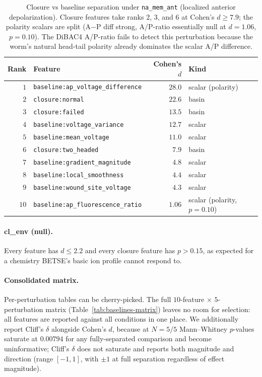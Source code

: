 \documentclass[11pt,a4paper]{article}
\begin{document}
\begin{table}[h]\centering\small
\caption{Closure vs baseline separation under \texttt{na\_mem\_ant} (localized anterior depolarization). Closure features take ranks $2$, $3$, and $6$ at Cohen's $d\geq 7.9$; the polarity scalars are split (A$-$P diff strong, A/P-ratio essentially null at $d=1.06$, $p=0.10$). The DiBAC4 A/P-ratio fails to detect this perturbation because the worm's natural head-tail polarity already dominates the scalar A/P difference.}\label{tab:baselines-naant}
\begin{tabular}{rlrl}\toprule
Rank & Feature & Cohen's $d$ & Kind \\
\midrule
$1$  & \texttt{baseline:ap\_voltage\_difference} & $\mathbf{28.0}$ & scalar (polarity) \\
$2$  & \texttt{closure:normal}                    & $\mathbf{22.6}$ & basin \\
$3$  & \texttt{closure:failed}                    & $13.5$  & basin \\
$4$  & \texttt{baseline:voltage\_variance}        & $12.7$  & scalar \\
$5$  & \texttt{baseline:mean\_voltage}            & $11.0$  & scalar \\
$6$  & \texttt{closure:two\_headed}               & $7.9$   & basin \\
$7$  & \texttt{baseline:gradient\_magnitude}      & $4.8$   & scalar \\
$8$  & \texttt{baseline:local\_smoothness}        & $4.4$   & scalar \\
$9$  & \texttt{baseline:wound\_site\_voltage}     & $4.3$   & scalar \\
$10$ & \texttt{baseline:ap\_fluorescence\_ratio}  & $1.06$  & scalar (polarity, $p=0.10$) \\
\bottomrule\end{tabular}
\end{table}

\paragraph{cl\_env (null).}
Every feature has $d\leq 2.2$ and every closure feature has $p>0.15$, as expected for a chemistry BETSE's basic ion profile cannot respond to.

\paragraph{Consolidated matrix.}
Per-perturbation tables can be cherry-picked. The full $10$-feature $\times$ $5$-perturbation matrix (Table~\ref{tab:baselines-matrix}) leaves no room for selection: all features are reported against all conditions in one place. We additionally report Cliff's $\delta$ alongside Cohen's $d$, because at $N=5/5$ Mann--Whitney $p$-values saturate at $0.00794$ for any fully-separated comparison and become uninformative; Cliff's $\delta$ does not saturate and reports both magnitude and direction (range $[-1,1]$, with $\pm 1$ at full separation regardless of effect magnitude).
\end{document}
